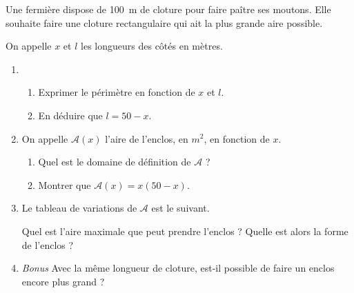 \documentclass[12pt]{article}
\begin{document}
\begin{exercice}
  Une fermière dispose de 100~m de cloture pour faire paître ses moutons. Elle souhaite faire une cloture rectangulaire qui ait la plus grande aire possible.

  \begin{center}
  \end{center}
  On appelle $x$ et $l$ les longueurs des côtés en mètres.
  \begin{enumerate}
    \item 
      \begin{enumerate}
        \item Exprimer le périmètre en fonction de $x$ et $l$.
        \item En déduire que $l=50-x$.
      \end{enumerate}
    \item On appelle $\mathcal{A}(x)$ l'aire de l'enclos, en $m^2$, en fonction de $x$.
      \begin{enumerate}
        \item Quel est le domaine de définition de $\mathcal{A}$ ?
        \item Montrer que $\mathcal{A}(x)=x\left( 50-x \right)$.
      \end{enumerate}
    \item Le tableau de variations de $\mathcal{A}$ est le suivant.
      \begin{center}
      \end{center}
      Quel est l'aire maximale que peut prendre l'enclos ? Quelle est alors la forme de l'enclos ?
    \item \emph{Bonus} Avec la même longueur de cloture, est-il possible de faire un enclos encore plus grand ?
  \end{enumerate}
\end{exercice}
\end{document}
